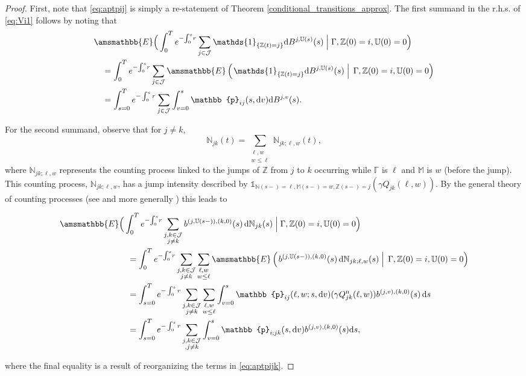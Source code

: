 \documentclass[11pt,leqno]{amsart}
\numberwithin{table}{section}
\numberwithin{figure}{section}
\numberwithin{equation}{section}
\newcommand{\dd}{\mathrm{d}}
\newcommand{\1}{{\mathds{1}}}
\newcommand{\0}{\mat{0}}
\newcommand{\E}{\amsmathbb{E}}
\newcommand{\ap}[1]{\mathbb{#1}}
\begin{document}
\begin{proof}
First, note that \eqref{eq:aptpij} is simply a re-statement of Theorem \ref{conditional_transitions_approx}.
The first summand in the r.h.s. of \eqref{eq:Vi1} follows by noting that
\begin{align*}
& \E\Big(\int_0^T e^{-{ \int_0^s} r}\sum_{j\in\mathcal{J}} \mathds{1}_{\{\ap{Z}(t)=j\}} \dd B^{j,\ap{U}(s)} (s) \;\Big|\; \Gamma, \ap{Z}(0)=i, \ap{U}(0)=0 \Big)\\
& \quad = \int_0^T e^{-{ \int_0^s} r}\sum_{j\in\mathcal{J}} \E\left(\left. \mathds{1}_{\{\ap{Z}(t)=j\}} \dd B^{j,\ap{U}(s)} (s) \;\right|\; \Gamma, \ap{Z}(0)=i, \ap{U}(0)=0 \right)\\
& \quad = \int^T_{s=0} e^{-\int_0^s r} \sum_{j\in\mathcal{J}}\int_{v=0}^s \ap{p}_{ij}(s,\dd v) \dd B^{j,v}(s) .
\end{align*}

For the second summand, observe that for $j\neq k$,
\[\ap{N}_{jk}(t)= \sum_{\substack{\ell,w\\ w\le \ell}} \ap{N}_{jk;\ell,w}(t),\]
where $\ap{N}_{jk;\ell,w}$ represents the counting process linked to the jumps of $\ap{Z}$ from $j$ to $k$ occurring while $\ap{\Gamma}$ is $\ell$ and $\ap{M}$ is $w$ (before the jump). This counting process, $\ap{N}_{jk;\ell,w}$, has a jump intensity described by $\mathds{1}_{\ap{N}(s-)=\ell, \ap{M}(s-)= w, \ap{Z}(s-)=j} (\gamma Q_{jk}(\ell,w))$. By the general theory of counting processes (see \cite{last1995marked} and more generally \cite{bremaud1981point}) this leads to

\begin{align*}
\E&\Big(\int_0^T e^{-{ \int_0^s} r} \sum_{\substack{j,k\in\mathcal{J}\\j\neq k}}b^{(j,\ap{U}(s-)),(k,0)}(s)\,\dd \ap{N}_{jk}(s) \;\Big|\; \Gamma, \ap{Z}(0)=i, \ap{U}(0)=0 \Big)\\
& \quad = \int_0^T e^{-{ \int_0^s} r} \sum_{\substack{j,k\in\mathcal{J}\\j\neq k}} \sum_{\substack{\ell,w\\ w\le \ell}} \E\left(\left. b^{(j,\ap{U}(s-)),(k,0)} (s)\,\dd \ap{N}_{jk;\ell, w}(s) \;\right|\;\Gamma, \ap{Z}(0)=i, \ap{U}(0)=0 \right)\\
& \quad = \int_{s=0}^T e^{-\int_0^s r} \sum_{\substack{j,k\in\mathcal{J}\\ j\neq k}}\sum_{\substack{\ell,w\\w\le \ell}} \int_{v=0}^s \ap{p}_{ij}(\ell,w;s,\dd v) (\gamma Q^{\mathrm{n}}_{jk}(\ell, w))b^{(j,v),(k,0)}(s)\,\dd s\\
&\quad = \int_{s=0}^T e^{-\int_0^s r} \sum_{\substack{j,k\in\mathcal{J}\\, j\neq k}}\int_{v=0}^s \ap{p}_{i;jk}(s,\dd v) b^{(j,v),(k,0)}(s)\dd s,
\end{align*}

where the final equality is a result of reorganizing the terms in \eqref{eq:aptpijk}.

\end{proof}
\end{document}
